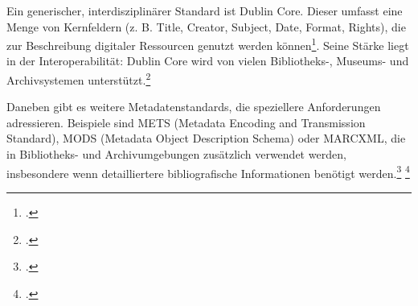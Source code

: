 \documentclass[12pt,a4paper]{report}
\begin{document}
  Ein generischer, interdisziplinärer Standard ist Dublin Core. Dieser umfasst eine Menge von Kernfeldern (z. B. Title, Creator, Subject, Date, Format, Rights), 
  die zur Beschreibung digitaler Ressourcen genutzt werden können\footcite[Vgl.][siehe The Elements]{dublincore_set}. 
  Seine Stärke liegt in der Interoperabilität: Dublin Core wird von vielen Bibliotheks-, Museums- und Archivsystemen unterstützt.\footcite[Vgl.][siehe 1.1. What is Metadata?]{dublincore_using}

  Daneben gibt es weitere Metadatenstandards, die speziellere Anforderungen adressieren. 
  Beispiele sind \ac{METS} (Metadata Encoding and Transmission Standard), \ac{MODS} (Metadata Object Description Schema) 
  oder \ac{MARCXML}, die in Bibliotheks- und Archivumgebungen zusätzlich verwendet werden, 
  insbesondere wenn detailliertere bibliografische Informationen benötigt werden.\footcite[Vgl.][]{loc_mets} \footcite[Vgl.][]{loc_mods}  
\end{document}
